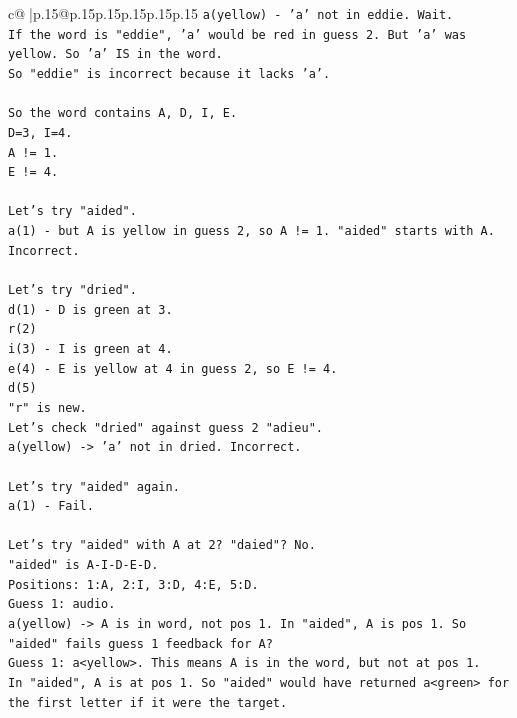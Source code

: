 \documentclass{article}
\begin{document}
{\begin{supertabular}{c@{$\;$}|p{.15\linewidth}@{}p{.15\linewidth}p{.15\linewidth}p{.15\linewidth}p{.15\linewidth}p{.15\linewidth}}
{{{\texttt{a(yellow) {-} 'a' not in eddie. Wait.} \\
\texttt{If the word is "eddie", 'a' would be red in guess 2. But 'a' was yellow. So 'a' IS in the word.} \\
\texttt{So "eddie" is incorrect because it lacks 'a'.} \\
\\ 
\texttt{So the word contains A, D, I, E.} \\
\texttt{D=3, I=4.} \\
\texttt{A != 1.} \\
\texttt{E != 4.} \\
\\ 
\texttt{Let's try "aided".} \\
\texttt{a(1) {-} but A is yellow in guess 2, so A != 1. "aided" starts with A. Incorrect.} \\
\\ 
\texttt{Let's try "dried".} \\
\texttt{d(1) {-} D is green at 3.} \\
\texttt{r(2)} \\
\texttt{i(3) {-} I is green at 4.} \\
\texttt{e(4) {-} E is yellow at 4 in guess 2, so E != 4.} \\
\texttt{d(5)} \\
\texttt{"r" is new.} \\
\texttt{Let's check "dried" against guess 2 "adieu".} \\
\texttt{a(yellow) {-}> 'a' not in dried. Incorrect.} \\
\\ 
\texttt{Let's try "aided" again.} \\
\texttt{a(1) {-} Fail.} \\
\\ 
\texttt{Let's try "aided" with A at 2? "daied"? No.} \\
\texttt{"aided" is A{-}I{-}D{-}E{-}D.} \\
\texttt{Positions: 1:A, 2:I, 3:D, 4:E, 5:D.} \\
\texttt{Guess 1: audio.} \\
\texttt{a(yellow) {-}> A is in word, not pos 1. In "aided", A is pos 1. So "aided" fails guess 1 feedback for A?} \\
\texttt{Guess 1: a<yellow>. This means A is in the word, but not at pos 1.} \\
\texttt{In "aided", A is at pos 1. So "aided" would have returned a<green> for the first letter if it were the target.} \\
}}}
\end{supertabular}}
\end{document}
